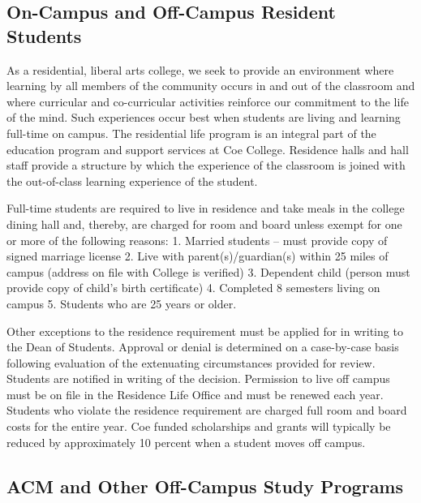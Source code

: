 \documentclass[
  letterpaper,
]{scrbook}
\begin{document}
\subsection{On-Campus and Off-Campus Resident
Students}\label{on-campus-and-off-campus-resident-students}

As a residential, liberal arts college, we seek to provide an
environment where learning by all members of the community occurs in and
out of the classroom and where curricular and co-curricular activities
reinforce our commitment to the life of the mind. Such experiences occur
best when students are living and learning full-time on campus. The
residential life program is an integral part of the education program
and support services at Coe College. Residence halls and hall staff
provide a structure by which the experience of the classroom is joined
with the out-of-class learning experience of the student.

Full-time students are required to live in residence and take meals in
the college dining hall and, thereby, are charged for room and board
unless exempt for one or more of the following reasons: 1. Married
students -- must provide copy of signed marriage license 2. Live with
parent(s)/guardian(s) within 25 miles of campus (address on file with
College is verified) 3. Dependent child (person must provide copy of
child's birth certificate) 4. Completed 8 semesters living on campus 5.
Students who are 25 years or older.

Other exceptions to the residence requirement must be applied for in
writing to the Dean of Students. Approval or denial is determined on a
case-by-case basis following evaluation of the extenuating circumstances
provided for review. Students are notified in writing of the decision.
Permission to live off campus must be on file in the Residence Life
Office and must be renewed each year. Students who violate the residence
requirement are charged full room and board costs for the entire year.
Coe funded scholarships and grants will typically be reduced by
approximately 10 percent when a student moves off campus.

\subsection{ACM and Other Off-Campus Study
Programs}\label{acm-and-other-off-campus-study-programs}
\end{document}
